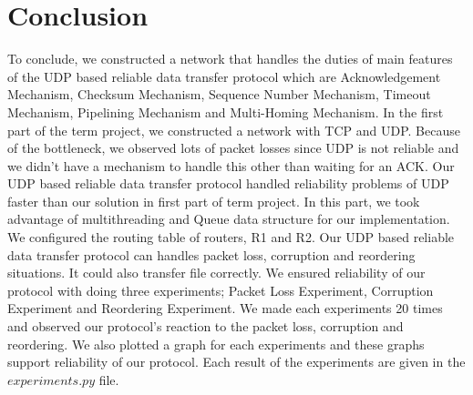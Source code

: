\documentclass[conference]{IEEEtran}
\begin{document}
\section{Conclusion}
To conclude, we constructed a network that handles the duties of main features of the UDP based reliable data transfer protocol which are Acknowledgement Mechanism, Checksum Mechanism, Sequence Number Mechanism, Timeout Mechanism, Pipelining Mechanism and Multi-Homing Mechanism. In the first part of the term project, we constructed a network with TCP and UDP. Because of the bottleneck, we observed lots of packet losses since UDP is not reliable and we didn't have a mechanism to handle this other than waiting for an ACK. Our UDP based reliable data transfer protocol handled reliability problems of UDP faster than our solution in first part of term project. In this part, we took advantage of multithreading and Queue data structure for our implementation. We configured the routing table of routers, R1 and R2. Our UDP based reliable data transfer protocol can handles packet loss, corruption and reordering situations. It could also transfer file correctly. We ensured reliability of our protocol with doing three experiments; Packet Loss Experiment, Corruption Experiment and Reordering Experiment. We made each experiments 20 times and observed our protocol's reaction to the packet loss, corruption and reordering. We also plotted a graph for each experiments and these graphs support reliability of our protocol. Each result of the experiments are given in the $experiments.py$ file.
\end{document}
